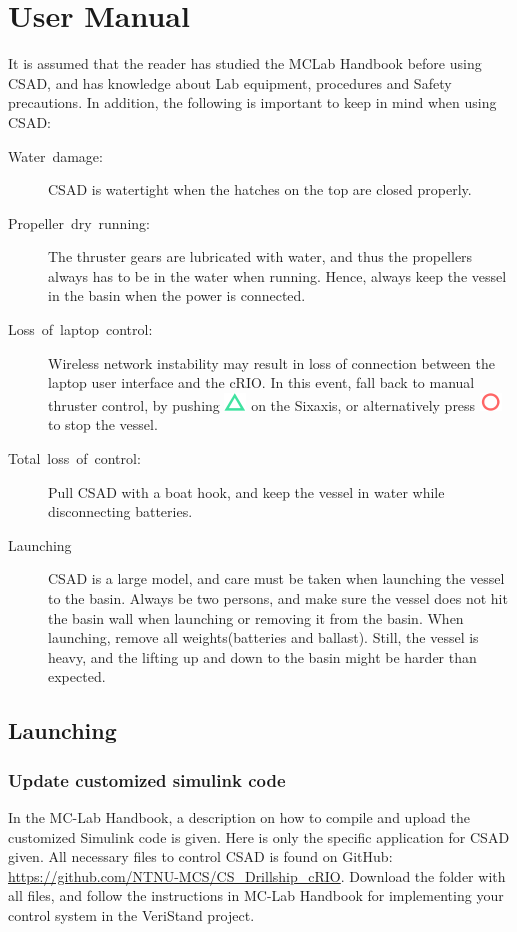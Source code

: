 \part{User Manual}\label{part2}
It is assumed that the reader has studied the MCLab Handbook before using CSAD, and has knowledge about Lab equipment, procedures and Safety precautions. In addition, the following is important to keep in mind when using CSAD:
\begin{description}
	\item [{Water~damage:}] CSAD is watertight when the hatches on the top are closed properly.  
	\item [{Propeller~dry~running:}] The thruster gears are lubricated with water, and thus the propellers always has to be in the water when running. Hence, always keep the vessel in the basin when the power is connected. 
	\item [{Loss~of~laptop~control:}] Wireless network instability may result in loss of connection between the laptop user interface and the cRIO. In this event, fall back to manual thruster control, by pushing \includegraphics[scale=0.4]{fig/sixaxis_triangle} on the Sixaxis, or alternatively press \includegraphics[scale=0.4]{fig/sixaxis_circle} to stop the vessel. 
	\item [{Total~loss~of~control:}] Pull CSAD with a boat hook, and keep the vessel in water while disconnecting batteries.
	\item [{Launching}] CSAD is a large model, and care must be taken when launching the vessel to the basin. Always be two persons, and make sure the vessel does not hit the basin wall when launching or removing it from the basin. When launching, remove all weights(batteries and ballast). Still, the vessel is heavy, and the lifting up and down to the basin might be harder than expected. 
\end{description}
\chapter{Launching}
\section{Update customized simulink code}
In the MC-Lab Handbook, a description on how to compile and upload the customized Simulink code is given. Here is only the specific application for CSAD given. All necessary files to control CSAD is found on GitHub: \url{https://github.com/NTNU-MCS/CS_Drillship_cRIO}. Download the folder with all files, and follow the instructions in MC-Lab Handbook for implementing your control system in the VeriStand project. 

